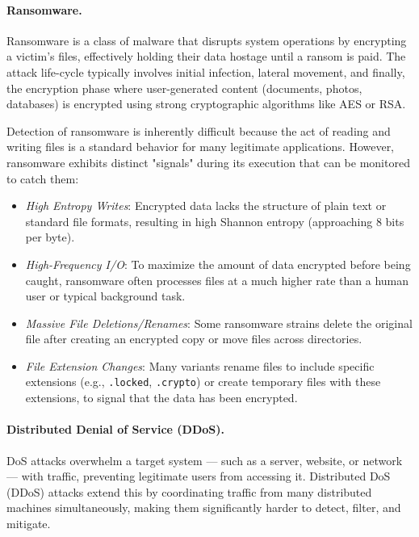 \documentclass[twocolumn, 10pt]{scrartcl}
\begin{document}
\paragraph{Ransomware.}
Ransomware is a class of malware that disrupts system operations by encrypting a victim's files, effectively holding their data hostage until a ransom is paid. 
The attack life-cycle typically involves initial infection, lateral movement, and finally, the encryption phase where user-generated content (documents, photos, databases) is encrypted using strong cryptographic algorithms like AES or RSA. 

Detection of ransomware is inherently difficult because the act of reading and writing files is a standard behavior for many legitimate applications. 
However, ransomware exhibits distinct "signals" during its execution that can be monitored to catch them: 
\begin{itemize}
    \item \textit{High Entropy Writes}: Encrypted data lacks the structure of plain text or standard file formats, resulting in high Shannon entropy (approaching 8 bits per byte).
    \item \textit{High-Frequency I/O}: To maximize the amount of data encrypted before being caught, ransomware often processes files at a much higher rate than a human user or typical background task.
    \item \textit{Massive File Deletions/Renames}: Some ransomware strains delete the original file after creating an encrypted copy or move files across directories.
    \item \textit{File Extension Changes}: Many variants rename files to include specific extensions (e.g., \texttt{.locked}, \texttt{.crypto}) or create temporary files with these extensions, to signal that the data has been encrypted.
\end{itemize}

\paragraph{Distributed Denial of Service (DDoS).}
DoS attacks overwhelm a target system — such as a server, website, or network — with traffic, preventing legitimate users from accessing it. Distributed DoS (DDoS) attacks extend this by coordinating traffic from many distributed machines simultaneously, making them significantly harder to detect, filter, and mitigate.
\end{document}
